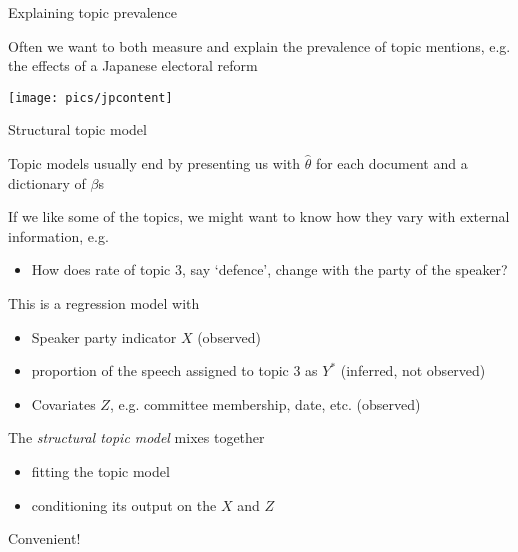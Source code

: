\documentclass{hertieteaching}
\begin{document}
\begin{frame}{Explaining topic prevalence}

Often we want to both measure and explain the prevalence of topic mentions, e.g. the effects of a Japanese electoral reform \parencite{Catalinac2018}

\centerline{\texttt{[image: pics/jpcontent]}}
	
\end{frame}


\begin{frame}{Structural topic model}

Topic models usually end by presenting us with $\hat{\theta}$ for each document and a dictionary of $\beta$s

If we like some of the topics, we might want to know how they vary with external information, e.g.
\begin{itemize}
  \item How does rate of topic 3, say `defence', change with the party of the speaker?
\end{itemize}
This is a regression model with 
\begin{itemize}
  \item Speaker party indicator $X$ (observed)
  \item proportion of the speech assigned to topic 3 as $Y^*$ (inferred, not observed)
  \item Covariates $Z$, e.g. committee membership, date, etc. (observed)
\end{itemize}
The \textit{structural topic model} \parencite{Roberts.etal2014} mixes together
\begin{itemize}
  \item fitting the topic model
  \item conditioning its output on the $X$ and $Z$
\end{itemize}
Convenient!


\end{frame}
\end{document}
